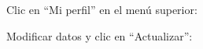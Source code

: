 \documentclass[12pt, spanish]{article}
\begin{document}
    \begin{steps}

        \item Clic en ``Mi perfil'' en el menú superior:

            \medskip
            \begin{minipage}[t]{\linewidth}
            \raggedright
        \end{minipage}

        \item Modificar datos y clic en ``Actualizar'':

            \medskip
            \begin{minipage}[t]{\linewidth}
            \raggedright
        \end{minipage}

    \end{steps}
\end{document}
